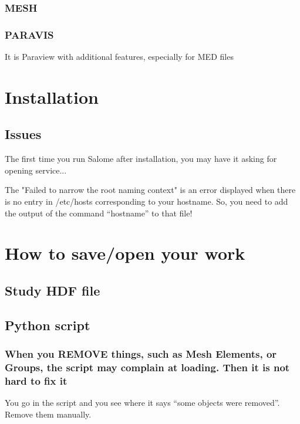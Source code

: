 \documentclass[10pt]{book}
\begin{document}
 \subsection{MESH}

 
  \subsection{PARAVIS}
  
  
  It is Paraview with additional features, especially for MED files

  
  
\chapter{Installation}

\section{Issues}

  The first time you run Salome after installation,
  you may have it asking for opening service...

The "Failed to narrow the root naming context" 
is an error displayed when there is no entry in /etc/hosts 
corresponding to your hostname. So, you need to add the output of the command
 ``hostname'' to that file!
 


\chapter{How to save/open your work}

  \section{Study HDF file}

  
  \section{Python script}

  
    \subsection{When you REMOVE things, such as Mesh Elements, or Groups, the script may complain at loading. Then it is not hard to fix it}
    
    
    You go in the script and you see where it says ``some objects were removed''.
    Remove them manually.
  
\end{document}
